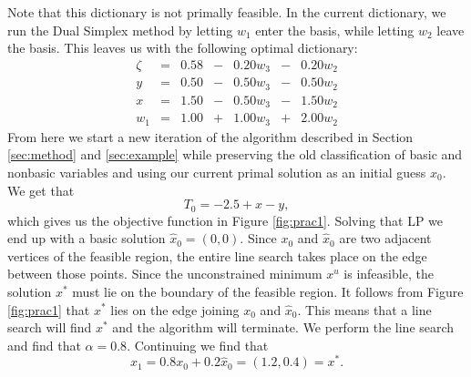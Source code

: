 Note that this dictionary is not primally feasible. 
In the current dictionary, we run the Dual Simplex method by letting $w_1$
enter the basis, while letting $w_2$ leave the basis.
This leaves us with the following optimal dictionary:
\[
    \begin{array}{rcrcrcr}
        \zeta &=& 0.58 &-& 0.20 w_3 &-& 0.20 w_2 \\ \hline
            y &=& 0.50 &-& 0.50 w_3 &-& 0.50 w_2 \\
            x &=& 1.50 &-& 0.50 w_3 &-& 1.50 w_2 \\
          w_1 &=& 1.00 &+& 1.00 w_3 &+& 2.00 w_2
    \end{array}
\]
From here we start a new iteration of the algorithm described in Section
\ref{sec:method} and \ref{sec:example} while preserving the old classification
of basic and nonbasic variables and using our current primal solution as an
initial guess $x_0$. We get that
\[
    T_0 = -2.5 + x - y,
\]
which gives us the objective function in Figure \ref{fig:prac1}. Solving that
LP we end up with a basic solution $\hat{x}_0 = (0,0)$. Since $x_0$ and
$\hat{x}_0$ are two adjacent vertices of the feasible region, the entire line
search takes place on the edge between those points.
Since the unconstrained minimum $x^u$ is infeasible, the solution $x^*$ must
lie on the boundary of the feasible region.
It follows from Figure \ref{fig:prac1} that $x^*$ lies on the edge joining 
$x_0$ and $\hat{x}_0$.
This means that a line search will find $x^*$ and the algorithm will terminate.
We perform the line search and find that $\alpha = 0.8$.
Continuing we find that
\[
    x_1 = 0.8 x_0 + 0.2 \hat{x}_0 = (1.2, 0.4) = x^*.
\]
